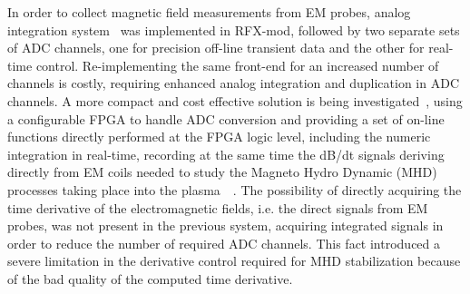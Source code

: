 In order to collect magnetic field measurements from EM probes, analog integration system~\cite{pomaro2005transducers} was implemented in RFX-mod, followed by two separate sets of ADC channels, one for precision off-line transient data and the other for real-time control. Re-implementing the same front-end for an increased number of channels is costly, requiring enhanced analog integration and duplication in ADC channels.  A more compact and cost effective solution is being investigated~\cite{gottardo18}, using a configurable FPGA to handle ADC conversion and providing a set of on-line functions directly performed at the FPGA logic level, including the numeric integration in real-time, recording at the same time the dB/dt signals deriving directly from EM coils needed to study the Magneto Hydro Dynamic (MHD) processes taking place into the plasma~\cite{zuin2009current}~\cite{innocente2014tearing}. The possibility of directly acquiring the time derivative of the electromagnetic fields, i.e. the direct signals from EM probes, was not present in the previous system, acquiring integrated signals in order to reduce the number of required ADC channels. This fact introduced a severe limitation in the derivative control required for MHD stabilization because of the bad quality of the computed time derivative.

